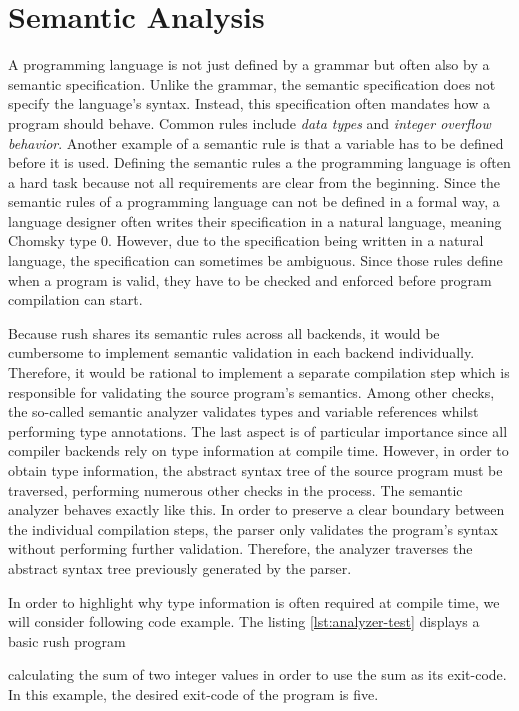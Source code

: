 \section{Semantic Analysis}

A programming language is not just defined by a grammar but often also by a semantic specification.
Unlike the grammar, the semantic specification does not specify the language's syntax.
Instead, this  specification often mandates how a program should behave.
Common rules include \emph{data types} and \emph{integer overflow behavior}.
Another example of a semantic rule is that a variable has to be defined before it is used.
Defining the semantic rules a the programming language is often a hard task because not all requirements are clear from the beginning.
Since the semantic rules of a programming language can not be defined in a formal way,
a language designer often writes their specification in a natural language, meaning Chomsky type 0.
However, due to the specification being written in a natural language, the specification can sometimes be ambiguous.
Since those rules define when a program is valid, they have to be checked and enforced before program compilation can start.

Because rush shares its semantic rules across all backends,
it would be cumbersome to implement semantic validation in each
backend individually. Therefore, it would be rational to implement a separate
compilation step which is responsible for validating the source program's
semantics. Among other checks, the so-called semantic analyzer validates types
and variable references whilst performing type annotations. The last aspect is
of particular importance since all compiler backends rely on type information at
compile time. However, in order to obtain type information, the abstract syntax
tree of the source program must be traversed, performing numerous other checks
in the process. The semantic analyzer behaves exactly like this. In order to
preserve a clear boundary between the individual compilation steps, the parser
only validates the program's syntax without performing further validation.
Therefore, the analyzer traverses the abstract syntax tree previously generated
by the parser.

In order to highlight why type information is often required at compile time, we
will consider following code example. The listing \ref{lst:analyzer-test} displays a basic rush program

calculating the sum of two integer values in order to use the sum as its
exit-code. In this example, the desired exit-code of the program is five.

